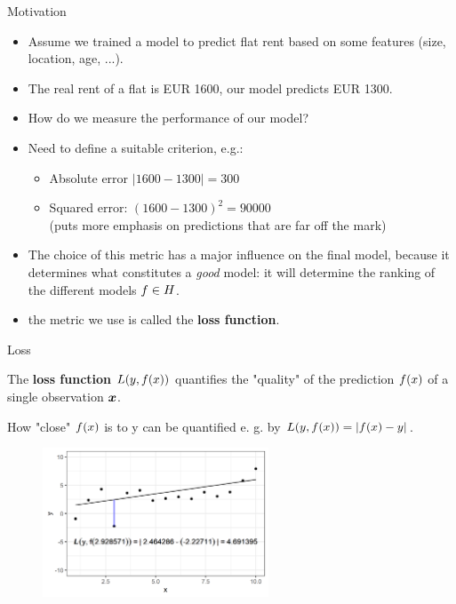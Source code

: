 \documentclass[11pt,compress,t,notes=noshow, xcolor=table]{beamer}
\begin{document}
\begin{vbframe}{Motivation}
  \begin{itemize}
    \item Assume we trained a model to predict flat rent based on some features
    (size, location, age, ...).
    \item The real rent of a flat is EUR 1600, our model predicts EUR 1300.
    \item How do we measure the performance of our model? 
    \item Need to define a suitable criterion, e.g.:
    \begin{itemize}
      \item Absolute error $|1600 - 1300| = 300$
      \item Squared error: $(1600 - 1300)^2 = 90000$\\
      (puts more emphasis on predictions that are far off the mark)
    \end{itemize}
    \item The choice of this metric has a major influence on the final model, because it determines what constitutes a \emph{good} model: it will determine the ranking of the different models $f \in H$.
    \item the metric we use is called the \textbf{loss function}. 
  \end{itemize}
\end{vbframe}


\begin{vbframe}{Loss}

The \textbf{loss function} $L(y, f(x))$ quantifies the "quality" of the prediction $f(x)$ of a single observation $\bm{x}$.

\lz

How "close" $f(x)$ is to y can be quantified e. g. by  $L(y, f(x)) = |f(x) - y|$.


\vfill
  
\begin{center}
\begin{figure}[!b]
\includegraphics[width=0.6\textwidth]{figure_man/ml-basic_riskmin-1-loss.png}
\end{figure}
\end{center}

\vspace*{0.01cm}

\end{vbframe}
\end{document}
